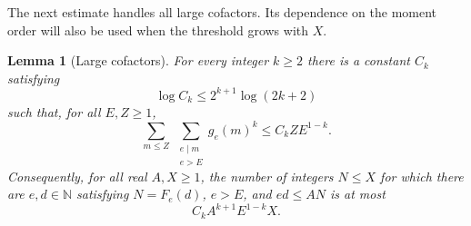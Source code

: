 \documentclass[11pt]{article}
\newtheorem{lemma}[theorem]{Lemma}
\theoremstyle{remark}
\newcommand{\N}{\mathbb N}
\newcommand{\1}{\mathbf 1}
\begin{document}
The next estimate handles all large cofactors.  Its dependence on the moment
order will also be used when the threshold grows with $X$.

\begin{lemma}[Large cofactors]\label{lem:moment}
For every integer $k\geq2$ there is a constant $C_k$ satisfying
\begin{equation}\label{eq:Ck-growth}
 \log C_k\leq 2^{k+1}\log(2k+2)
\end{equation}
such that, for all $E,Z\geq1$,
\begin{equation}\label{eq:moment}
 \sum_{m\leq Z}\ \sum_{\substack{e\mid m\\e>E}}g_e(m)^k
 \leq C_kZE^{1-k}.
\end{equation}
Consequently, for all real $A,X\geq1$, the number of integers $N\leq X$
for which there are $e,d\in\N$ satisfying $N=F_e(d)$, $e>E$, and
$ed\leq AN$ is at most
\begin{equation}\label{eq:large-count}
 C_kA^{k+1}E^{1-k}X.
\end{equation}
\end{lemma}
\end{document}
